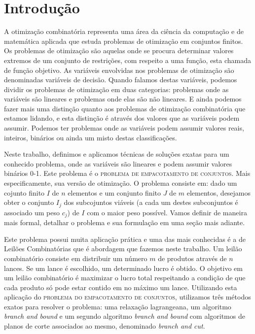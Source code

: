 \documentclass{article}
\begin{document}
	
	
	\section{Introdução}
	A otimização combinatória representa uma área da ciência da computação e de matemática aplicada que estuda problemas de otimização em conjuntos finitos. Os problemas de otimização são aquelas onde se procura determinar valores extremos de um conjunto de restrições, com respeito a uma função, esta chamada de função objetivo. As variáveis envolvidas nos problemas de otimização são denominadas variáveis de decisão. Quando falamos destas variáveis, podemos dividir os problemas de otimização em duas categorias: problemas onde as variáveis são lineares e problemas onde elas são não lineares. E ainda podemos fazer mais uma distinção quanto aos problemas de otimização combinatória que estamos lidando, e esta distinção é através dos valores que as variáveis podem assumir. Podemos ter problemas onde as variáveis podem assumir valores reais, inteiros, binários ou ainda um misto destas classificações.
	
	Neste trabalho, definimos e aplicamos técnicas de soluções exatas para um conhecido problema, onde as variáveis são lineares e podem assumir valores binários 0-1. Este problema é o \textsc{problema de empacotamento de conjuntos}. Mais especificamente, sua versão de otimização.
	O problema consiste em: dado um cojunto finito $I$ de $n$ elementos e um conjunto finito $J$ de $m$ elementos, desejamos obter o conjunto $I_j$ dos subcojuntos viáveis (a cada um destes subconjuntos é associado um peso $c_j$) de $I$ com o maior peso possível. Vamos definir de maneira mais formal, detalhar o problema e sua formulação em uma seção mais adiante.
	
	Este problema possui muita aplicação prática e uma das mais conhecidas é a de Leilões Combinatórias que é abordagem que fazemos neste trabalho. Um leilão combinatório consiste em distribuir um número $m$ de produtos através de $n$ lances. Se um lance é escolhido, um determinado lucro é obtido. O objetivo em um leilão combinatório é maximizar o lucro total respeitando a condição de que cada produto só pode estar contido em no máximo um lance. Utilizando esta aplicação do \textsc{problema do empacotamento de conjuntos}, utilizamos três métodos exatos para resolver o problema: uma relaxação lagrangeana, um algoritmo \emph{branch and bound} e um segundo algoritmo \emph{branch and bound} com algoritmos de planos de corte associados ao mesmo, denominado \emph{branch and cut}.
	
\end{document}
